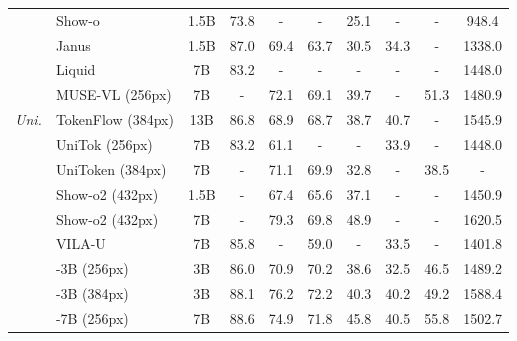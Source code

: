 \begin{table}[t!]
{\begin{NiceTabular}{llcccccccc}
                 &Show-o \citep{xie2024showo}               &1.5B           &73.8  &-       &-     &25.1 &-     &-         &948.4\\
                 &Janus \citep{wu2024janus}                 &1.5B           &87.0  &69.4    &63.7  &30.5 &34.3  &-         &1338.0\\
                 &Liquid \citep{liquid}                     &7B             &83.2  &-       &-     &-    &-     &-         &1448.0\\
                 &MUSE-VL (256px) \citep{xie2025musevl}     &7B             &-     &72.1    &69.1  &39.7 &-     &51.3      &1480.9\\
    \textit{Uni.}&TokenFlow (384px) \citep{qu2024tokenflow} &13B            &86.8  &68.9    &68.7  &38.7 &40.7  &-         &1545.9\\
                 &UniTok (256px) \citep{unitok}             &7B             &83.2  &61.1    &-     &-    &33.9  &-         &1448.0\\
                 &UniToken (384px) \citep{jiao2025unitoken} &7B             &-     &71.1    &69.9  &32.8 &-     &38.5      &-\\
                 &Show-o2 (432px) \citep{xie2025showo2}     &1.5B           &-     &67.4    &65.6  &37.1 &-     &-         &1450.9\\
                 &Show-o2 (432px) \citep{xie2025showo2}     &7B             &-     &79.3    &69.8  &48.9 &-     &-         &1620.5\\
                 &VILA-U \citep{wu2025vilau}                &7B             &85.8  &-       &59.0  &-    &33.5  &-         &1401.8\\
    \compare{}&\compare{}\ours{}-3B (256px) &\compare{}3B   &\compare{}86.0 &\compare{}70.9 &\compare{}70.2 &\compare{}38.6 &\compare{}32.5 &\compare{}46.5 &\compare{}1489.2\\
    \compare{}&\compare{}\ours{}-3B (384px) &\compare{}3B   &\compare{}88.1 &\compare{}76.2 &\compare{}72.2 &\compare{}40.3 &\compare{}40.2 &\compare{}49.2 &\compare{}1588.4\\
    \compare{}&\compare{}\ours{}-7B (256px) &\compare{}7B   &\compare{}88.6 &\compare{}74.9 &\compare{}71.8 &\compare{}45.8 &\compare{}40.5 &\compare{}55.8 &\compare{}1502.7\\

\end{NiceTabular}}
\end{table}
